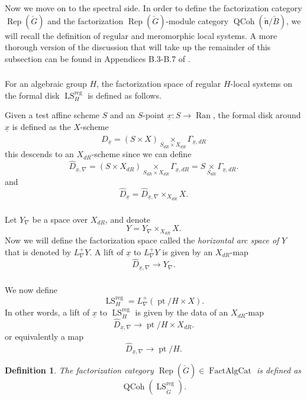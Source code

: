\documentclass[10pt]{amsart}
\newtheorem{defn}[subsubsection]{Definition}
\theoremstyle{remark}
\newtheorem{rem}[subsubsection]{Remark}
\newcommand{\on}[1]{\operatorname{#1}}
\newcommand{\QCoh}{\on{QCoh}}
\newcommand{\IndCoh}{\on{IndCoh}}
\newcommand{\ncheck}{\check{\mathfrak{n}}}
\newcommand{\Bcheck}{\check{B}}
\newcommand{\FactAlgCat}{\on{FactAlgCat}}
\newcommand{\sssec}[1]{\subsubsection{}}
\begin{document}
\sssec{}
Now we move on to the spectral side. In order to define the factorization category $\on{Rep}(\check{G})$ and the factorization $\on{Rep}(\check{G})$-module category $\QCoh(\ncheck/\Bcheck)$, we will recall the definition of regular and meromorphic local systems. A more thorough version of the discussion that will take up the remainder of this subsection can be found in Appendices B.3-B.7 of \cite{GLC2}.

\sssec{}
For an algebraic group $H$, the factorization space of regular $H$-local systems on the formal disk $\on{LS}_H^{\on{reg}}$ is defined as follows.

Given a test affine scheme $S$ and an $S$-point $\underline{x}: S \to \on{Ran}$, the formal disk around $\underline{x}$ is defined as the $X$-scheme
$$
    \hat{D}_{\underline{x}} = (S \times X) \underset{S_{dR} \times X_{dR}}{\times} \Gamma_{\underline{x}, dR}
$$
this descends to an $X_{dR}$-scheme since we can define
$$
     \hat{D}_{\underline{x}, \nabla} = (S \times X_{dR}) \underset{S_{dR} \times X_{dR}}{\times} \Gamma_{\underline{x}, dR} = S \underset{S_{dR}}{\times} \Gamma_{\underline{x}, dR}.
$$
and
$$
    \hat{D}_{\underline{x}} = \hat{D}_{\underline{x}, \nabla} \times_{X_{dR}} X.
$$

\sssec{}
Let $Y_{\nabla}$ be a space over $X_{dR}$, and denote
$$
Y = Y_{\nabla} \times_{X_{dR}} X.
$$
Now we will define the factorization space called the \emph{horizontal arc space of} $Y$ that is denoted by $L_{\nabla}^+Y$. A lift of $\underline{x}$ to $L_{\nabla}^+Y$ is given by an $X_{dR}$-map
$$
\hat{D}_{\underline{x}, \nabla} \to Y_{\nabla}.
$$

\sssec{}
We now define 
$$
\on{LS}_H^{\on{reg}} = L_{\nabla}^+(\on{pt}/H \times X).
$$
In other words, a lift of $\underline{x}$ to $\on{LS}_H^{\on{reg}}$ is given by the data of an $X_{dR}$-map
$$
\hat{D}_{\underline{x}, \nabla} \to \on{pt}/H \times X_{dR}.
$$
or equivalently a map
$$
\hat{D}_{\underline{x}, \nabla} \to \on{pt}/H.
$$

\begin{defn}
    The factorization category $\on{Rep}(\check{G}) \in \FactAlgCat$ is defined as 
    $$
    \QCoh(\on{LS}_{\check{G}}^{\on{reg}}).
    $$
\end{defn}

\end{document}
